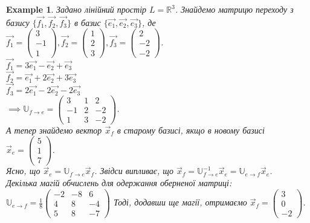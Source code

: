 \documentclass[a4paper, 10pt]{article}
\theoremstyle{theoremdd}
\newtheorem{example}[theorem]{Example}
\begin{document}
\begin{example} Задано лінійний простір $L = \mathbb{R}^3$. Знайдемо матрицю переходу з базису $\{\vec{f_1},\vec{f_2},\vec{f_3}\}$ в базис $\{\vec{e_1},\vec{e_2}, \vec{e_3}\}$, де\\
$\vec{f_1} = \begin{pmatrix}
3 \\ -1 \\ 1
\end{pmatrix}, \vec{f_2} = \begin{pmatrix}
1 \\ 2 \\ 3
\end{pmatrix}, \vec{f_3} = \begin{pmatrix}
2 \\ -2 \\ -2
\end{pmatrix}$.\\
$\vec{f_1} = 3\vec{e_1} -\vec{e_2} + \vec{e_3}$\\
$\vec{f_2} = \vec{e_1} +2\vec{e_2} + 3\vec{e_3}$\\
$\vec{f_3} = 2\vec{e_1} -2\vec{e_2} -2\vec{e_3}$\\
$\implies \mathbb{U}_{f \to e} = \begin{pmatrix}
3 & 1 & 2 \\
-1 & 2 & -2 \\
1 & 3 & -2
\end{pmatrix}$.
\bigskip \\
А тепер знайдемо вектор $\vec{x}_f$ в старому базисі, якщо в новому базисі $\vec{x}_e = \begin{pmatrix}
 5 \\ 1 \\ 7
\end{pmatrix}$.\\
Ясно, що $\vec{x}_e = \mathbb{U}_{f \to e}\vec{x}_f$. Звідси випливає, що $\vec{x}_f = \mathbb{U}^{-1}_{f \to e} \vec{x}_e = \mathbb{U}_{e \to f} \vec{x}_e$.\\
Декілька магій обчислень для одержання оберненої матриці:\\
$\mathbb{U}_{e \to f} = \displaystyle \frac{1}{8} \begin{pmatrix}
-2 & -8 & 6 \\
4 & 8 & -4 \\
5 & 8 & -7
\end{pmatrix}$
Тоді, додавши ще магії, отримаємо $\vec{x}_f = \begin{pmatrix}
3 \\ 0 \\ -2
\end{pmatrix}$.
\end{example}
\end{document}

